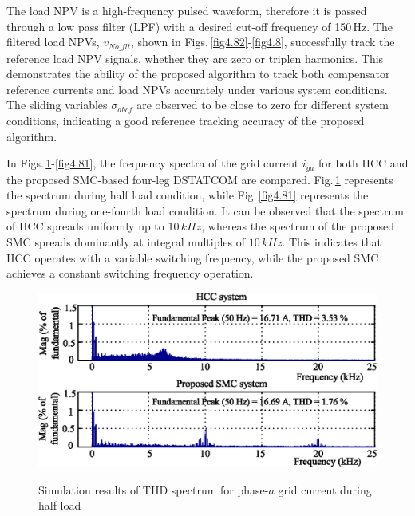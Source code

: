 The load NPV is a high-frequency pulsed waveform, therefore it is passed through a low pass filter (LPF) with a desired cut-off frequency of 150\,Hz. The filtered load NPVs, $v_{No\_flt}$, shown in Figs.\,\ref{fig4.82}-\ref{fig4.8}, successfully track the reference load NPV signals, whether they are zero or triplen harmonics. This demonstrates the ability of the proposed algorithm to track both compensator reference currents and load NPVs accurately under various system conditions. The sliding variables $\sigma_{abcf}$ are observed to be close to zero for different system conditions, indicating a good reference tracking accuracy of the proposed algorithm.

In Figs.\,\ref{4.SimTHD1}-\ref{fig4.81}, the frequency spectra of the grid current $i_{ga}$ for both HCC and the proposed SMC-based four-leg DSTATCOM are compared. Fig.\,\ref{4.SimTHD1} represents the spectrum during half load condition, while Fig.\,\ref{fig4.81} represents the spectrum during one-fourth load condition. It can be observed that the spectrum of HCC spreads uniformly up to $10\,\si{kHz}$, whereas the spectrum of the proposed SMC spreads dominantly at integral multiples of $10\,\si{kHz}$. This indicates that HCC operates with a variable switching frequency, while the proposed SMC achieves a constant switching frequency operation.
\begin{figure}[h!]  
		\centering
		\includegraphics[scale=0.9]{figures/Chapter_4/Mine/SimTHD1.eps}\\ 
		\caption{Simulation results of THD spectrum for phase-$a$ grid current during half load}  
		\label{4.SimTHD1}
\end{figure}
